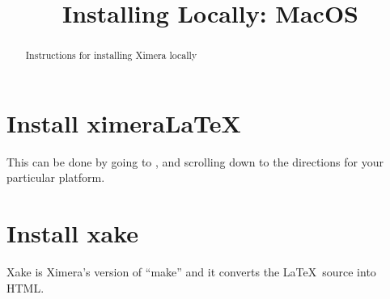 \documentclass{ximera}
\title{Installing Locally: MacOS}
\begin{document}
\begin{abstract}
Instructions for installing Ximera locally
\end{abstract}
\maketitle


\section{Install ximeraLaTeX}

This can be done by going to , and scrolling
down to the directions for your particular platform.




\section{Install xake}

Xake is Ximera's version of ``make'' and it converts the
\LaTeX\ source into HTML.
\end{document}

